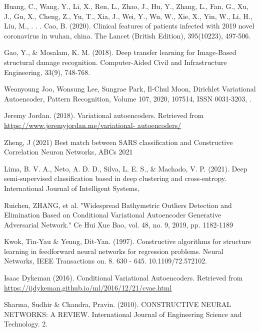 \documentclass[runningheads]{llncs}
\begin{document}
{\begin{thebibliography}{10}
Huang, C., Wang, Y., Li, X., Ren, L., Zhao, J., Hu, Y., Zhang, L., Fan, G., Xu, J., Gu, X., Cheng, Z., Yu, T., Xia, J., Wei, Y., Wu, W., Xie, X., Yin, W., Li, H., Liu, M., . . . Cao, B. (2020). Clinical features of patients infected with 2019 novel coronavirus in wuhan, china. The Lancet (British Edition), 395(10223), 497-506. 


Gao, Y., \& Mosalam, K. M. (2018). Deep transfer learning for Image‐Based structural damage recognition. Computer-Aided Civil and Infrastructure Engineering, 33(9), 748-768. 


Weonyoung Joo, Wonsung Lee, Sungrae Park, Il-Chul Moon, Dirichlet Variational Autoencoder, Pattern Recognition,
 Volume 107, 2020, 107514, ISSN 0031-3203, .
 
Jeremy Jordan. (2018). Variational autoencoders. Retrieved from \url{https://www.jeremyjordan.me/variational- autoencoders/}

Zheng, J (2021) Best match between SARS classification and Constructive Correlation Neuron Networks, ABCs 2021 

Lima, B. V. A., Neto, A. D. D., Silva, L. E. S., \& Machado, V. P. (2021). Deep semi‐supervised classification based in deep clustering and cross‐entropy. International Journal of Intelligent Systems, 

Ruichen, ZHANG, et al. "Widespread Bathymetric Outliers Detection and Elimination Based on Conditional Variational Autoencoder Generative Adversarial Network." Ce Hui Xue Bao, vol. 48, no. 9, 2019, pp. 1182-1189


Kwok, Tin-Yau \& Yeung, Dit-Yan. (1997). Constructive algorithms for structure learning in feedforward neural networks for regression problems. Neural Networks, IEEE Transactions on. 8. 630 - 645. 10.1109/72.572102. 

Isaac Dykeman (2016). Conditional Variational Autoencoders. Retrieved from \url{https://ijdykeman.github.io/ml/2016/12/21/cvae.html}

Sharma, Sudhir & Chandra, Pravin. (2010). CONSTRUCTIVE NEURAL NETWORKS: A REVIEW. International Journal of Engineering Science and Technology. 2. 


\end{thebibliography}

}


% 
\end{document}
